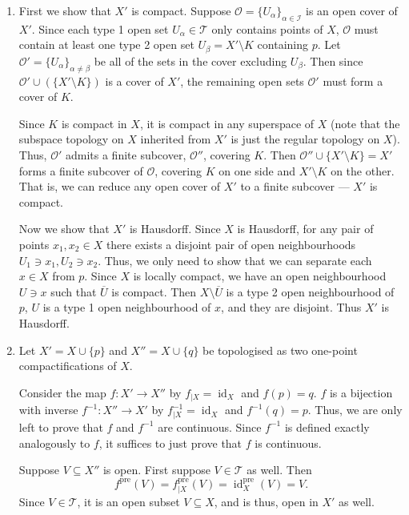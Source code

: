 \documentclass[12 pt, letterpaper]{hmcpset}
\begin{document}
\begin{solution}
\begin{enumerate}
			Now we have shown that $\mathcal{T}'$ satisfies all properties of a topology, and thus, $X'$ is a topological space.
			
		\item First we show that $X'$ is compact. Suppose $\mathcal{O} = \{ U_{\alpha} \}_{\alpha \in \mathcal{I}}$ is an open cover of $X'$. Since each type 1 open set $U_{\alpha} \in \mathcal{T}$ only contains points of $X$, $\mathcal{O}$ must contain at least one type 2 open set $U_{\beta} = X' \setminus K$ containing $p$. Let $\mathcal{O}' = \{ U_{\alpha} \}_{\alpha \neq \beta}$ be all of the sets in the cover excluding $U_{\beta}$. Then since $\mathcal{O}' \cup (\{ X' \setminus K \})$ is a cover of $X'$, the remaining open sets $\mathcal{O}'$ must form a cover of $K$.

			Since $K$ is compact in $X$, it is compact in any superspace of $X$ (note that the subspace topology on $X$ inherited from $X'$ is just the regular topology on $X$). Thus, $\mathcal{O}'$ admits a finite subcover, $\mathcal{O}''$, covering $K$. Then $\mathcal{O}'' \cup \{ X' \setminus K \} = X'$ forms a finite subcover of $\mathcal{O}$, covering $K$ on one side and $X' \setminus K$ on the other. That is, we can reduce any open cover of $X'$ to a finite subcover --- $X'$ is compact.

			Now we show that $X'$ is Hausdorff. Since $X$ is Hausdorff, for any pair of points $x_{1}, x_{2} \in X$ there exists a disjoint pair of open neighbourhoods $U_{1} \ni x_{1}, U_{2} \ni x_{2}$. Thus, we only need to show that we can separate each $x \in X$ from $p$. Since $X$ is locally compact, we have an open neighbourhood $U \ni x$ such that $\overline{U}$ is compact. Then $X \setminus \overline{U}$ is a type 2 open neighbourhood of $p$, $U$ is a type 1 open neighbourhood of $x$, and they are disjoint. Thus $X'$ is Hausdorff.

		\item Let $X' = X \cup \{ p \}$ and $X'' = X \cup \{ q \}$ be topologised as two one-point compactifications of $X$.

			Consider the map $f : X' \to X''$ by $f_{\mid X} = \operatorname{id}_{X}$ and $f(p) = q$. $f$ is a bijection with inverse $f^{-1} : X'' \to X'$ by $f^{-1}_{\mid X} = \operatorname{id}_{X}$ and $f^{-1}(q) = p$. Thus, we are only left to prove that $f$ and $f^{-1}$ are continuous. Since $f^{-1}$ is defined exactly analogously to $f$, it suffices to just prove that $f$ is continuous.

			Suppose $V \subseteq X''$ is open. First suppose $V \in \mathcal{T}$ as well. Then
			\[
				f^{\text{pre}}(V) = f^{\text{pre}}_{\mid X}(V) = \operatorname{id}_{X}^{\text{pre}}(V) = V.
			\]
			Since $V \in \mathcal{T}$, it is an open subset $V \subseteq X$, and is thus, open in $X'$ as well.


\end{enumerate}
\end{solution}
\end{document}
